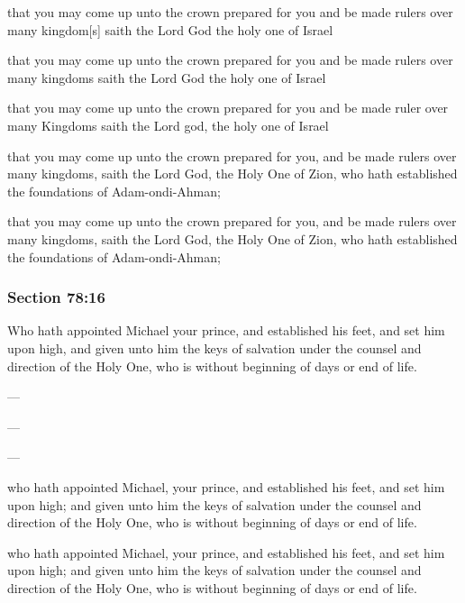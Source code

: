 		\begin{framed}
		\scriptsize
			\begin{compactdesc}
				\item[JSP] that you may come up unto the crown prepared for you and be made rulers over many kingdom[s] saith the Lord God the holy one of Israel
				\item[RB1] that you may come up unto the crown prepared for you and be made rulers over many kingdoms saith the Lord God the holy one of Israel
				\item[RB2] that you may come up unto the crown prepared for you and be made ruler over many Kingdoms saith the Lord god, the holy one of Israel
				\item[DC 1835] that you may come up unto the crown prepared for you, and be made rulers over many kingdoms, saith the Lord God, the Holy One of Zion, who hath established the foundations of Adam-ondi-Ahman;
				\item[DC 1844] that you may come up unto the crown prepared for you, and be made rulers over many kingdoms, saith the Lord God, the Holy One of Zion, who hath established the foundations of Adam-ondi-Ahman;
			\end{compactdesc}
		\end{framed}

	\subsubsection{Section 78:16} %
		\label{DC78-16}

		Who hath appointed Michael your prince, and established his feet, and set him upon high, and given unto him the keys of salvation under the counsel and direction of the Holy One, who is without beginning of days or end of life.

		\begin{framed}
		\scriptsize
			\begin{compactdesc}
				\item[JSP] ---
				\item[RB1] ---
				\item[RB2] ---
				\item[DC 1835] who hath appointed Michael, your prince, and established his feet, and set him upon high; and given unto him the keys of salvation under the counsel and direction of the Holy One, who is without beginning of days or end of life.
				\item[DC 1844] who hath appointed Michael, your prince, and established his feet, and set him upon high; and given unto him the keys of salvation under the counsel and direction of the Holy One, who is without beginning of days or end of life.
			\end{compactdesc}
		\end{framed}

